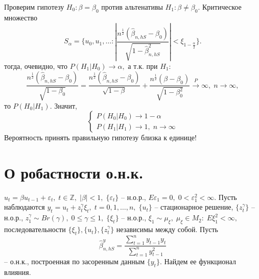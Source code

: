 Проверим гипотезу $H_0: \beta = \beta_0$ против альтенативы $H_1: \beta \neq \beta_0.$ Критическое множество 
$$S_{\alpha} = \lbrace u_0, u_1, \ldots:  |\dfrac{n^{\frac{1}{2}}(\hat{\beta}_{n, hS} - \beta_0)}{\sqrt{1 - \hat{\beta}_{n, hS}^2}}| < \xi_{1 - \frac{\alpha}{2}} \rbrace.$$
тогда, очевидно, что $P(H_1|H_0) \to \alpha,$ а т.к. при $H_1:$
$$\dfrac{n^{\frac{1}{2}}(\hat{\beta}_{n, hS} - \beta_0)}{\sqrt{1 - \beta_0}} = \dfrac{n^{\frac{1}{2}}(\hat{\beta}_{n, hS} - \beta_0)}{\sqrt{1 - \beta}} + \dfrac{n^{\frac{1}{2}}(\beta - \beta_0)}{\sqrt{1 - \beta_0^2}} \stackrel{P}{\to} \infty, \; n \to \infty,$$
то $P(H_0|H_1)$. Значит, 
$$
\begin{cases}
    P(H_0|H_0) \to 1 - \alpha \\
    P(H_1|H_1) \to 1, \; n \to \infty 
\end{cases}$$
Вероятность принять правильную гипотезу близка к единице!

\section{О робастности о.н.к.}\label{lec:13/sec:5}
$u_t = \beta u_{t - 1} + \varepsilon_t, \; t \in \mathbb{Z}, \; |\beta| < 1, \; \lbrace \varepsilon_t \rbrace$ -- н.о.р., $E\varepsilon_1 = 0, \; 0 < \varepsilon_1^2 < \infty.$ Пусть наблюдаются $y_t = u_t + z_t^{\gamma}\xi_t, \; t = 0, 1, \ldots, n, \; \lbrace u_t \rbrace$ -- стационарное решение, $\lbrace z_t^{\gamma} \rbrace $ -- н.о.р., $z_1^{\gamma} \sim Br(\gamma), \; 0 \leq \gamma \leq 1, \; \lbrace \xi_t \rbrace$ -- н.о.р., $\xi_1 \sim \mu_{\xi}, \; \mu_{\xi} \in M_2: \; E\xi_1^2 < \infty,$ последовательности $\lbrace \xi_t \rbrace, \lbrace u_t \rbrace, \lbrace z_t^{\gamma} \rbrace$ независимы между собой. Пусть
$$\hat{\beta}_{n, hS}^y = \dfrac{\sum\limits_{t = 1}^n y_{t - 1}y_t}{\sum\limits_{t = 1}^n y_{t - 1}^2}$$
-- о.н.к., построенная по засоренным данным $\lbrace y_t \rbrace$. Найдем ее функционал влияния.

